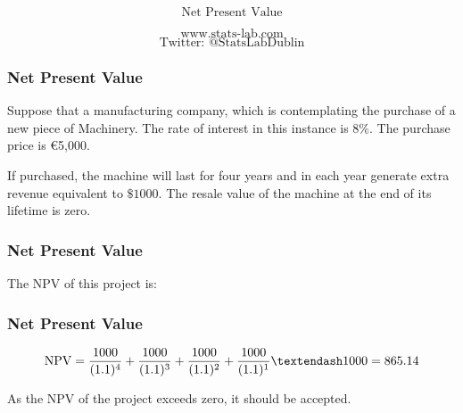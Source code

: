 \documentclass{beamer}
\begin{document}
\begin{frame}
\bigskip
{
\Huge
\[ \mbox{Net Present Value} \]

}
{
\LARGE
\[ \mbox{www.stats-lab.com} \]
\[ \mbox{Twitter: @StatsLabDublin} \]
}
\end{frame}
\begin{frame}
\frametitle{Net Present Value}
Suppose that a manufacturing company, which is contemplating the purchase of a new piece of 
Machinery. The rate of interest in this instance is $8\%$. The purchase price is €5,000. 

If purchased, the machine will last for four years and in each year generate extra revenue 
equivalent to $\$1000$. The resale value of the machine at the end of its lifetime is zero.

\end{frame}
\begin{frame}
\frametitle{Net Present Value}
 The 
NPV of this project is:
\end{frame}
\begin{frame}
\frametitle{Net Present Value}
\[\mbox{NPV} = {1000\over (1.1)^4} + {1000\over (1.1)^3} + {1000 \over (1.1)^2} + {1000\over(1.1)^1} – 1000 = 865.14 \]
 
As the NPV of the project exceeds zero, it should be accepted.
\end{frame}
\end{document}
